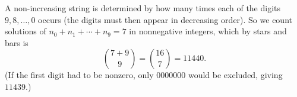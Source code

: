 A non-increasing string is determined by how many times each of the digits $9,8,\dots,0$ occurs (the digits must then appear in decreasing order). So we count solutions of $n_0+n_1+\cdots+n_9=7$ in nonnegative integers, which by stars and bars is
\[
\binom{7+9}{9}=\binom{16}{7}=\boxed{11440}.
\]
(If the first digit had to be nonzero, only $0000000$ would be excluded, giving $11439$.)
